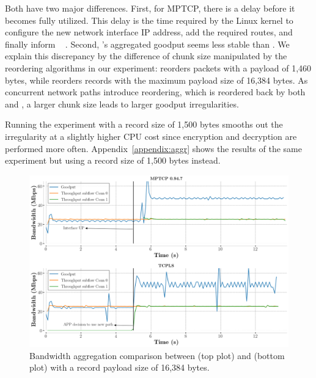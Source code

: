 Both have two major differences. First, for MPTCP, there is a delay before it becomes fully utilized. 
This delay is the time required by the Linux kernel
to configure the new network interface IP address, add the required routes, and
finally inform \mptcp~\cite{paasch2012exploring} .
Second, \tcpls's aggregated goodput seems less stable than \mptcp. We explain 
this discrepancy by the difference of chunk size manipulated by the reordering 
algorithms in our experiment: \mptcp reorders packets with a payload of 1,460 
bytes, while \tcpls reorders records with the maximum 
payload size of 16,384 bytes. As concurrent network paths introduce reordering, 
which is reordered back by both \mptcp and \tcpls, a larger chunk size 
leads to larger goodput irregularities. 

Running the experiment with a record size 
of 1,500 bytes smooths out the irregularity at a slightly higher CPU cost since 
encryption and decryption are performed more often.
Appendix~\ref{appendix:aggr} shows the results of the same experiment but using
a \tls record size of 1,500 bytes instead.


\begin{figure}[!t]
  \begin{center}
    \includegraphics[width=\columnwidth]{figures/aggregate_dual.png}
  \end{center}
\vspace{-0.5cm}
  \caption{Bandwidth aggregation comparison between \mptcp (top plot) and
    \tcpls (bottom plot) with a record payload size of 16,384 bytes.}
  \label{fig:multipath_aggregation}
\end{figure}

